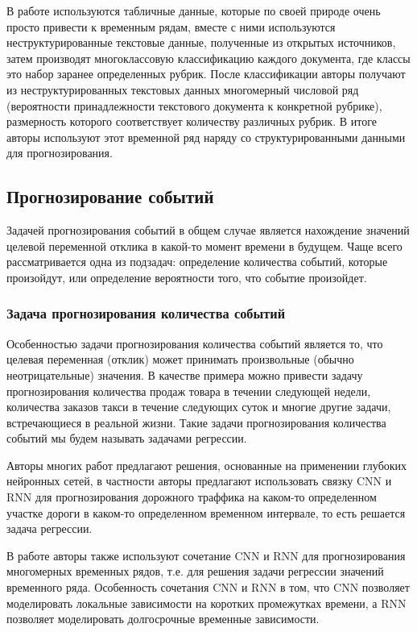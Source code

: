 В работе \cite{struct_unstruct_prediction} используются табличные данные, которые по своей природе очень просто привести к временным рядам, вместе с ними используются неструктурированные текстовые данные, полученные из открытых источников, затем производят многоклассовую классификацию каждого документа, где классы это набор заранее определенных рубрик. После классификации авторы получают из неструктурированных текстовых данных многомерный числовой ряд (вероятности принадлежности текстового документа к конкретной рубрике), размерность которого соответствует количеству различных рубрик. В итоге авторы используют этот временной ряд наряду со структурированными данными для прогнозирования.

\subsection{Прогнозирование событий}
Задачей прогнозирования событий в общем случае является нахождение значений целевой переменной отклика в какой-то момент времени в будущем. Чаще всего рассматривается одна из подзадач: определение количества событий, которые произойдут, или определение вероятности того, что событие произойдет.

\subsubsection{Задача прогнозирования количества событий}
Особенностью задачи прогнозирования количества событий является то, что целевая переменная (отклик) может принимать произвольные (обычно неотрицательные) значения. В качестве примера можно привести задачу прогнозирования количества продаж товара в течении следующей недели, количества заказов такси в течение следующих суток и многие другие задачи, встречающиеся в реальной жизни. Такие задачи прогнозирования количества событий мы будем называть задачами регрессии.

Авторы многих работ предлагают решения, основанные на применении глубоких нейронных сетей, в частности авторы \cite{traffic_flow_forecasting} предлагают использовать связку CNN и RNN для прогнозирования дорожного траффика на каком-то определенном участке дороги в каком-то определенном временном интервале, то есть решается задача регрессии.

В работе \cite{modeling_patterns_with_DNN} авторы также используют сочетание CNN и RNN для прогнозирования многомерных временных рядов, т.е. для решения задачи регрессии значений временного ряда. Особенность сочетания CNN и RNN в том, что CNN позволяет моделировать локальные зависимости на коротких промежутках времени, а RNN позволяет моделировать долгосрочные временные зависимости.

